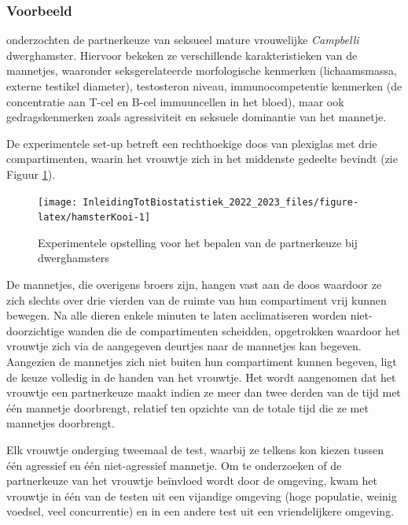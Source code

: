 \documentclass[
  12pt,dutch,coursenotes]{book}
\begin{document}
\hypertarget{voorbeeld}{%
\subsubsection{Voorbeeld}\label{voorbeeld}}

\citet{Rogovin2017} onderzochten de partnerkeuze van seksueel mature vrouwelijke \emph{Campbelli} dwerghamster.
Hiervoor bekeken ze verschillende karakteristieken van de mannetjes, waaronder seksgerelateerde morfologische kenmerken (lichaamsmassa, externe testikel diameter), testosteron niveau, immunocompetentie kenmerken (de concentratie aan T-cel en B-cel immuuncellen in het bloed), maar ook gedragskenmerken zoals agressiviteit en seksuele dominantie van het mannetje.

De experimentele set-up betreft een rechthoekige doos van plexiglas met drie compartimenten, waarin het vrouwtje zich in het middenste gedeelte bevindt (zie Figuur \ref{fig:hamsterKooi}).

\begin{figure}

{\centering \texttt{[image: InleidingTotBiostatistiek\_2022\_2023\_files/figure-latex/hamsterKooi-1]} 

}

\caption{Experimentele opstelling voor het bepalen van de partnerkeuze bij dwerghamsters}\label{fig:hamsterKooi}
\end{figure}

De mannetjes, die overigens broers zijn, hangen vast aan de doos waardoor ze zich slechts over drie vierden van de ruimte van hun compartiment vrij kunnen bewegen. Na alle dieren enkele minuten te laten acclimatiseren worden niet-doorzichtige wanden die de compartimenten scheidden, opgetrokken waardoor het vrouwtje zich via de aangegeven deurtjes naar de mannetjes kan begeven. Aangezien de mannetjes zich niet buiten hun compartiment kunnen begeven, ligt de keuze volledig in de handen van het vrouwtje. Het wordt aangenomen dat het vrouwtje een partnerkeuze maakt indien ze meer dan twee derden van de tijd met één mannetje doorbrengt, relatief ten opzichte van de totale tijd die ze met mannetjes doorbrengt.

Elk vrouwtje onderging tweemaal de test, waarbij ze telkens kon kiezen tussen één agressief en één niet-agressief mannetje. Om te onderzoeken of de partnerkeuze van het vrouwtje beïnvloed wordt door de omgeving, kwam het vrouwtje in één van de testen uit een vijandige omgeving (hoge populatie, weinig voedsel, veel concurrentie) en in een andere test uit een vriendelijkere omgeving.
\end{document}
